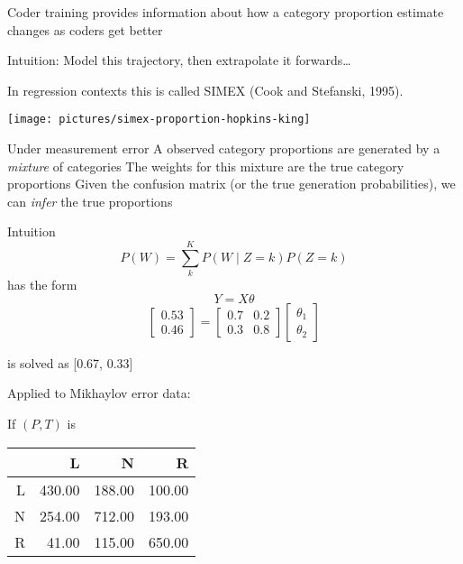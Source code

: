 \documentclass{mediumfoils}
\begin{document}
Coder training provides information about how a category proportion estimate changes as coders get better

Intuition: 
\ita
\itm Model this trajectory, then extrapolate it forwards\ldots
\itz

In regression contexts this is called SIMEX (Cook and Stefanski, 1995).


\centerline{\texttt{[image: pictures/simex-proportion-hopkins-king]}}


Under measurement error
\ita
\itm A observed category proportions are generated by a \textit{mixture} of categories
\itm The weights for this mixture are the true category proportions
\itz
Given the confusion matrix (or the true generation probabilities), we can \textit{infer} the true proportions


Intuition
\[
{P(W)} = \sum^K_k {P(W \mid Z=k)} P(Z=k)
\]
has the form
\[
Y = X\theta
\]
\[
\left[\begin{array}{c}0.53 \\0.46\end{array}\right] = 
\left[\begin{array}{cc}0.7 & 0.2 \\0.3 & 0.8\end{array}\right] \left[\begin{array}{c}\theta_1 \\\theta_2\end{array}\right]
\]

is solved as [0.67, 0.33]


Applied to Mikhaylov error data:

If $(P, T)$ is

\begin{tabular}{rrrr}
  \hline
 & L & N & R \\ 
  \hline
L & 430.00 & 188.00 & 100.00 \\ 
  N & 254.00 & 712.00 & 193.00 \\ 
  R & 41.00 & 115.00 & 650.00 \\ 
   \hline
\end{tabular}

\newpage 
\end{document}
